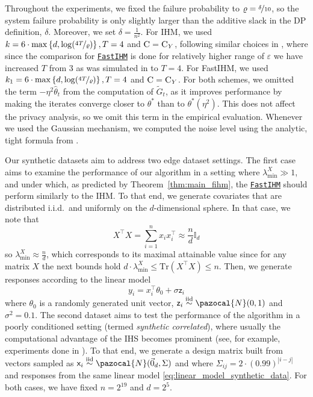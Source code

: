 \documentclass[11pt]{article}
\theoremstyle{definition}
\theoremstyle{plain}
\providecommand{\theoremref}[1]{Theorem~\ref{#1}}
\newcommand{\iid}{i.i.d.}
\newcommand{\eps}{{\varepsilon}}
\providecommand{\brI}{\mathbb{I}}
\newcommand{\sx}{{\mathsf{x}}}
\newcommand{\abs}[1]{\left| #1 \right|}
\newcommand{\simiid}{\overset{\mathrm{iid}}{\sim}}
\newcommand{\pN}{\pazocal{N}}
\renewcommand{\eps}{\varepsilon}
\newcommand{\FastIHM}{\hyperref[alg:private_fast_hessian_sketch]{\texttt{FastIHM}}\xspace}
\begin{document}
Throughout the experiments, we fixed the failure probability to $\varrho = \nicefrac{\delta}{10}$, so the system failure probability is only slightly larger than the additive slack in the DP definition, $\delta$. Moreover, we set $\delta = \frac{1}{n^2}$. For IHM, we used $k = 6 \cdot \max\left\{d, \log(\nicefrac{4T}{\varrho})\right\}, T=4$ and $\textsc{C} = \textsc{C}_Y$, following similar choices in \citet{lev2026near}, where since the comparison for \FastIHM is done for relatively higher range of $\eps$ we have increased $T$ from $3$ as was simulated in \citet{lev2026near} to $T=4$. For FastIHM, we used $k_1 = 6 \cdot \max\left\{d, \log(\nicefrac{4T}{\varrho})\right\}, T=4$ and $\textsc{C} = \textsc{C}_Y$.
For both schemes, we omitted the term $-\eta^2\widehat{\theta}_t$ from the computation of $\widetilde{G}_t$, as it improves performance by making the iterates converge closer to $\theta^{*}$ than to $\theta^{*}(\eta^2)$. This does not affect the privacy analysis, so we omit this term in the empirical evaluation. Whenever we used the Gaussian mechanism, we computed the noise level using the analytic, tight formula from \citet{balle2018improving}.

Our synthetic datasets aim to address two edge dataset settings. The first case aims to examine the performance of our algorithm in a setting where $\lambda^{X}_{\min} \gg 1$, and under which, as predicted by \theoremref{thm:main_fihm}, the \FastIHM should perform similarly to the IHM. To that end, we generate covariates that are distributed \iid \ and uniformly on the $ d$-dimensional sphere. In that case, we note that 
\begin{equation}
    X^{\top}X = \sum^{n}_{i=1}x_ix^{\top}_i \approx \frac{n}{d}\brI_d
\end{equation}
so $\lambda^{X}_{\min} \approx \frac{n}{d}$, which corresponds to its maximal attainable value since for any matrix $X$ the next bounds hold $d\cdot\lambda^{X}_{\min} \leq \mathrm{Tr}(X^{\top}X) \leq n$. Then, we generate responses according to the linear model 
\begin{equation}
    \label{eq:linear_model_synthetic_data}
    y_i = x^{\top}_i \theta_0 + \sigma \mathsf{z}_i
\end{equation}
where $\theta_0$ is a randomly generated unit vector, $\mathsf{z}_i \simiid \pN(0, 1)$ and $\sigma^2 = 0.1$. The second dataset aims to test the performance of the algorithm in a poorly conditioned setting (termed \emph{synthetic correlated}), where usually the computational advantage of the IHS becomes prominent (see, for example, experiments done in \citet{pilanci_hessiansketch, lacotte2020optimal}). To that end, we generate a design matrix built from vectors sampled as $\sx_i \simiid \pN(\vec{0}_d, \Sigma)$ and where $\Sigma_{ij} = 2\cdot (0.99)^{\abs{i-j}}$ and responses from the same linear model \eqref{eq:linear_model_synthetic_data}. For both cases, we have fixed $n= 2^{19}$ and $d = 2^{5}$.
\end{document}

